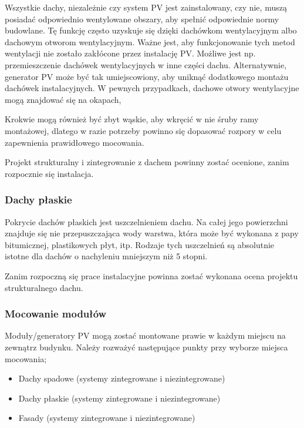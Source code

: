 \documentclass[12pt,a4paper]{article}
\begin{document}
Wszystkie dachy, niezależnie czy system PV jest zainstalowany, czy nie, 
muszą posiadać odpowiednio wentylowane obszary, aby spełnić odpowiednie 
normy budowlane. Tę funkcję często uzyskuje się dzięki dachówkom 
wentylacyjnym albo dachowym otworom wentylacyjnym. Ważne jest, aby 
funkcjonowanie tych metod wentylacji nie zostało zakłócone przez 
instalację PV. Możliwe jest np. przemieszczenie dachówek wentylacyjnych w inne części dachu. 
Alternatywnie, generator PV może być tak umiejscowiony, aby uniknąć 
dodatkowego montażu dachówek instalacyjnych. W pewnych przypadkach, dachowe otwory wentylacyjne mogą znajdować się na okapach, 

Krokwie mogą również być zbyt wąskie, aby wkręcić w nie śruby ramy 
montażowej, dlatego w razie potrzeby powinno się dopasować rozpory w 
celu zapewnienia prawidłowego mocowania. 

Projekt strukturalny i zintegrowanie z dachem powinny zostać ocenione, 
zanim rozpocznie się instalacja. 

\subsubsection{Dachy płaskie}

Pokrycie dachów płaskich jest uszczelnieniem dachu. Na całej jego 
powierzchni znajduje się nie przepuszczająca wody warstwa, która może 
być wykonana z papy bitumicznej, plastikowych płyt, itp. Rodzaje tych 
uszczelnień są absolutnie istotne dla dachów o nachyleniu mniejszym niż 
5 stopni. 

Zanim rozpoczną się prace instalacyjne powinna zostać wykonana ocena 
projektu strukturalnego dachu. 

 

\subsubsection{Mocowanie modułów}
 

Moduły/generatory PV mogą zostać montowane prawie w każdym miejscu na 
zewnątrz budynku. Należy rozważyć następujące punkty przy wyborze 
miejsca mocowania; 

\begin{itemize}
\item Dachy spadowe (systemy zintegrowane i niezintegrowane) 
\item Dachy płaskie (systemy zintegrowane i niezintegrowane) 
\item Fasady (systemy zintegrowane i niezintegrowane) 
\end{itemize}
 
\end{document}
